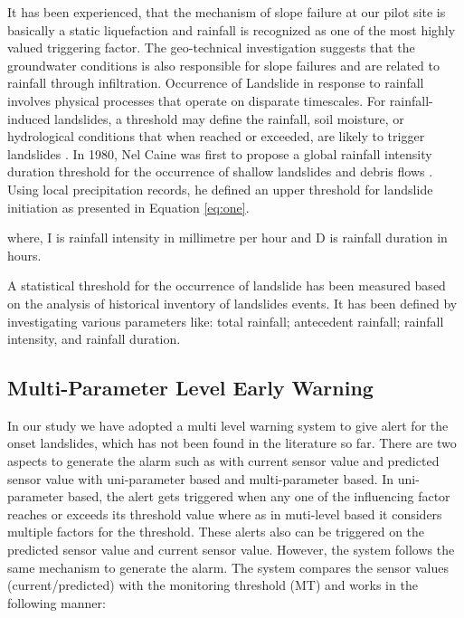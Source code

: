 \documentclass[conference]{IEEEtran}
\begin{document}
\par
It has been experienced, that the mechanism of slope failure at our pilot site is basically a static liquefaction and rainfall is
recognized as one of the most highly valued triggering factor. The geo-technical investigation suggests that the groundwater conditions is also responsible for slope failures and are related to rainfall through infiltration. Occurrence of Landslide in response to rainfall involves physical processes that operate on disparate timescales. For rainfall-induced landslides, a threshold may define the rainfall, soil moisture, or hydrological conditions that when reached or exceeded, are likely to trigger landslides \cite{richard}. In 1980, Nel Caine was first to propose a global rainfall intensity duration threshold for the occurrence of shallow landslides and debris flows \cite{yang}. Using local precipitation records, he defined an upper threshold for landslide initiation as presented in Equation \ref{eq:one}.

where, I is rainfall intensity in millimetre per hour and D is rainfall duration in hours.
\par
A statistical threshold for the occurrence of landslide has been measured based on the analysis of historical inventory of
landslides events. It has been defined by investigating various parameters like: total rainfall; antecedent rainfall; rainfall
intensity, and rainfall duration.

\subsection{Multi-Parameter Level Early Warning}
In our study we have adopted a multi level warning system to give alert for the onset landslides, which has not been found
in the literature so far. There are two aspects to generate the alarm such as with current sensor value and predicted sensor value with uni-parameter based and multi-parameter based. In uni-parameter based, the alert gets triggered when any one of the influencing factor reaches or exceeds its threshold value where as in muti-level based it considers multiple factors for the threshold. These alerts also can be triggered on the predicted sensor value and current sensor value. However, the system follows the same mechanism to generate the alarm. The system compares the sensor values (current/predicted) with the monitoring threshold (MT) and works in the following manner:
\end{document}
